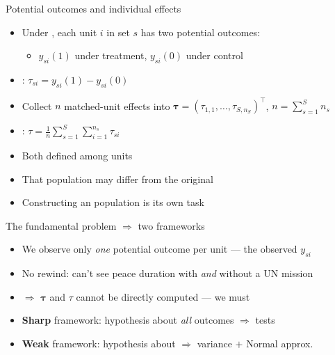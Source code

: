\documentclass[table, xcolor = {dvipsnames}, 9pt]{beamer}
\theoremstyle{plain}
\newcommand{\mh}[1]{{\color{magenta}{#1}}}
\begin{document}
\begin{frame}[t]{Potential outcomes and individual effects}
\vfill
\begin{itemize} \vfill
\item Under \mh{SUTVA}, each unit $i$ in set $s$ has two potential outcomes: \vfill
\begin{itemize} \vfill
\item $y_{si}(1)$ under treatment, \quad $y_{si}(0)$ under control \vfill
\end{itemize} \vfill
\item \mh{Individual effect}: $\tau_{si} = y_{si}(1) - y_{si}(0)$ \vfill
\item Collect $n$ matched-unit effects into $\bm{\tau} = (\tau_{1,1}, \ldots, \tau_{S,n_S})^{\top}$, $n = \sum_{s = 1}^S n_s$ \vfill
\item \mh{Average treatment effect}: $\tau = \frac{1}{n} \sum_{s=1}^S \sum_{i=1}^{n_s} \tau_{si}$ \vfill
\item Both defined among \mh{matched} units \vfill
\item That population may differ from the original \vfill
\item Constructing an \mh{interpretable} population is its own task \\ \citep{fogartyetal2016,traskinsmall2011} \vfill
\end{itemize} \vfill
\end{frame}
\begin{frame}[t]{The fundamental problem $\Rightarrow$ two frameworks}
\vfill
\begin{itemize} \vfill
\item We observe only \emph{one} potential outcome per unit --- the observed $y_{si}$ \vfill
\item[] No rewind: can't see peace duration with \emph{and} without a UN mission \vfill
\item[] $\Rightarrow$ $\bm{\tau}$ and $\tau$ cannot be directly computed --- we must \mh{infer} \vfill
\item \textbf{Sharp} framework: hypothesis about \emph{all} outcomes $\Rightarrow$ \mh{exact} tests \vfill
\item \textbf{Weak} framework: hypothesis about \mh{ATE} $\Rightarrow$ variance $+$ Normal approx. \vfill
\end{itemize} \vfill
\end{frame}
\end{document}
